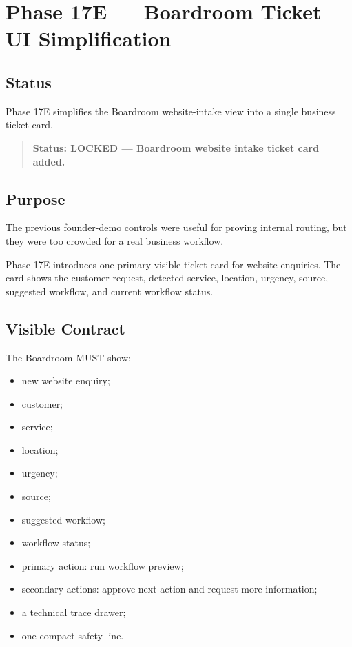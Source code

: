 \section{Phase 17E --- Boardroom Ticket UI Simplification}
\label{sec:aion-phase17e-boardroom-ticket-ui-simplification}

\subsection{Status}

Phase 17E simplifies the Boardroom website-intake view into a single business ticket card.

\begin{quote}
\textbf{Status: LOCKED --- Boardroom website intake ticket card added.}
\end{quote}

\subsection{Purpose}

The previous founder-demo controls were useful for proving internal routing, but they were too crowded for a real business workflow.

Phase 17E introduces one primary visible ticket card for website enquiries. The card shows the customer request, detected service, location, urgency, source, suggested workflow, and current workflow status.

\subsection{Visible Contract}

The Boardroom MUST show:

\begin{itemize}
  \item new website enquiry;
  \item customer;
  \item service;
  \item location;
  \item urgency;
  \item source;
  \item suggested workflow;
  \item workflow status;
  \item primary action: run workflow preview;
  \item secondary actions: approve next action and request more information;
  \item a technical trace drawer;
  \item one compact safety line.
\end{itemize}

